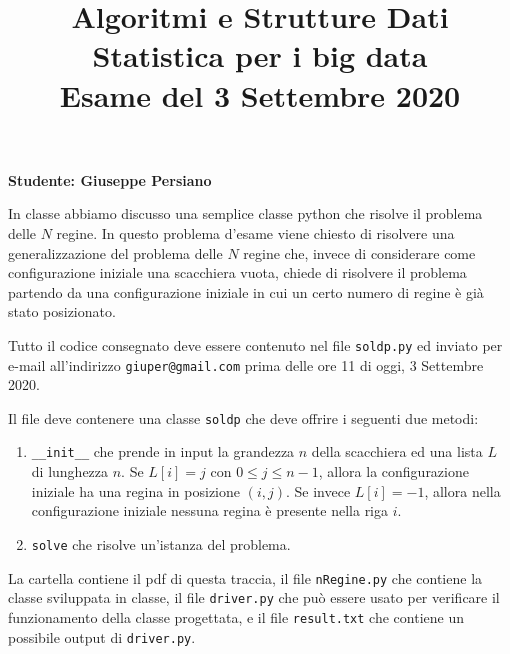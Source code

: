 \documentclass{amsart}
\begin{document}
\title{Algoritmi e Strutture Dati\\
Statistica per i big data\\
Esame del 3 Settembre 2020
}


\newcommand{\NomeStudente}{Giuseppe Persiano}
\newcommand{\nomeClasse}{soldp}


\maketitle

\hfill{{\bf Studente: \NomeStudente}}

\smallskip

In classe abbiamo discusso una semplice classe python che risolve il 
problema delle $N$ regine.
In questo problema d'esame viene chiesto di risolvere una generalizzazione 
del problema  delle $N$ regine che,
invece di considerare come configurazione iniziale una scacchiera vuota,
chiede di risolvere il problema partendo da una configurazione iniziale
in cui un certo numero di regine \`e gi\`a stato posizionato.

\medskip{}
Tutto il codice consegnato deve essere contenuto nel file
{\tt \nomeClasse .py} ed inviato per e-mail all'indirizzo
{\tt giuper@gmail.com} prima delle ore 11 di oggi, 3 Settembre 2020.

Il file deve contenere una classe {\tt \nomeClasse} che deve offrire
i seguenti due metodi:
\begin{enumerate}
\item {\tt \_\_init\_\_} che prende in input la grandezza $n$ della scacchiera
ed una lista $L$ di lunghezza $n$.
Se $L[i]=j$ con $0\leq j\leq n-1$, allora la configurazione iniziale
ha una regina in posizione $(i,j)$.
Se invece $L[i]=-1$, allora nella configurazione iniziale nessuna regina
\`e presente nella riga $i$.
\item {\tt solve} che risolve un'istanza del problema.
\end{enumerate}

La cartella contiene il pdf di questa traccia, il file
{\tt nRegine.py} che contiene la classe sviluppata in classe,
il file {\tt driver.py} che pu\`o essere usato
per verificare il funzionamento della classe progettata, e il file  {\tt result.txt} che contiene
un possibile output di {\tt driver.py}.
\end{document}
